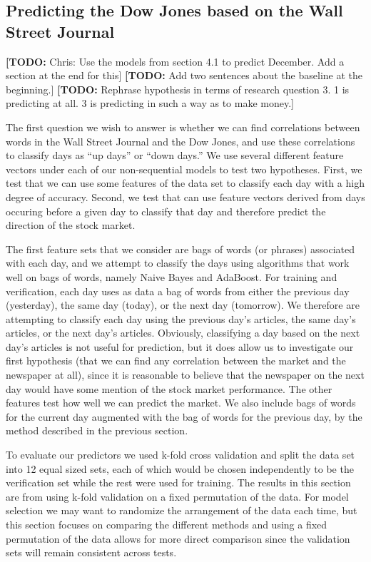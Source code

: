 \documentclass[10pt, twocolumn]{article}
\def\TODO#1{\noindent\textbf{[TODO:} #1]}
\begin{document}
\subsection{Predicting the Dow Jones based on the Wall Street Journal}
\label{wsj->dj}

\TODO{Chris: Use the models from section 4.1 to predict December. Add a section at the end for this}
\TODO{Add two sentences about the baseline at the beginning.}
\TODO{Rephrase hypothesis in terms of research question 3. 1 is predicting at all. 3 is predicting in such a way as to make money.}

The first question we wish to answer is whether we can find correlations between words in the Wall Street Journal and the Dow Jones, and use these correlations to classify days as ``up days'' or ``down days.'' We use several different feature vectors under each of our non-sequential models to test two hypotheses. First, we test that we can use some features of the data set to classify each day with a high degree of accuracy. Second, we test that can use feature vectors derived from days occuring before a given day to classify that day and therefore predict the direction of the stock market.

The first feature sets that we consider are bags of words (or phrases) associated with each day, and we attempt to classify the days using algorithms that work well on bags of words, namely Naive Bayes and AdaBoost. For training and verification, each day uses as data a bag of words from either the previous day (yesterday), the same day (today), or the next day (tomorrow). We therefore are attempting to classify each day using the previous day's articles, the same day's articles, or the next day's articles. Obviously, classifying a day based on the next day's articles is not useful for prediction, but it does allow us to investigate our first hypothesis (that we can find any correlation between the market and the newspaper at all), since it is reasonable to believe that the newspaper on the next day would have some mention of the stock market performance. The other features test how well we can predict the market. We also include bags of words for the current day augmented with the bag of words for the previous day, by the method described in the previous section.

To evaluate our predictors we used k-fold cross validation and split the data set into 12 equal sized sets, each of which would be chosen independently to be the verification set while the rest were used for training. The results in this section are from using k-fold validation on a fixed permutation of the data. For model selection we may want to randomize the arrangement of the data each time, but this section focuses on comparing the different methods and using a fixed permutation of the data allows for more direct comparison since the validation sets will remain consistent across tests.
\end{document}
